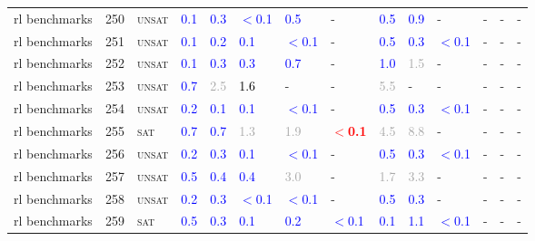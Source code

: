 \begin{center}
{\begin{longtable}{@{}llllllllllllll@{}}
rl benchmarks & 250 & \textsc{unsat} & \textcolor{blue}{0.1} & \textcolor{blue}{0.3} & \textcolor{blue}{$<$0.1} & \textcolor{blue}{0.5} & - & \textcolor{blue}{0.5} & \textcolor{blue}{0.9} & - & - & - & - \\
rl benchmarks & 251 & \textsc{unsat} & \textcolor{blue}{0.1} & \textcolor{blue}{0.2} & \textcolor{blue}{0.1} & \textcolor{blue}{$<$0.1} & - & \textcolor{blue}{0.5} & \textcolor{blue}{0.3} & \textcolor{blue}{$<$0.1} & - & - & - \\
rl benchmarks & 252 & \textsc{unsat} & \textcolor{blue}{0.1} & \textcolor{blue}{0.3} & \textcolor{blue}{0.3} & \textcolor{blue}{0.7} & - & \textcolor{blue}{1.0} & \textcolor{darkgray}{1.5} & - & - & - & - \\
rl benchmarks & 253 & \textsc{unsat} & \textcolor{blue}{0.7} & \textcolor{darkgray}{2.5} & \textcolor{black}{1.6} & - & - & \textcolor{darkgray}{5.5} & - & - & - & - & - \\
rl benchmarks & 254 & \textsc{unsat} & \textcolor{blue}{0.2} & \textcolor{blue}{0.1} & \textcolor{blue}{0.1} & \textcolor{blue}{$<$0.1} & - & \textcolor{blue}{0.5} & \textcolor{blue}{0.3} & \textcolor{blue}{$<$0.1} & - & - & - \\
rl benchmarks & 255 & \textsc{sat} & \textcolor{blue}{0.7} & \textcolor{blue}{0.7} & \textcolor{darkgray}{1.3} & \textcolor{darkgray}{1.9} & \textbf{\textcolor{red}{$<$0.1}} & \textcolor{darkgray}{4.5} & \textcolor{darkgray}{8.8} & - & - & - & - \\
rl benchmarks & 256 & \textsc{unsat} & \textcolor{blue}{0.2} & \textcolor{blue}{0.3} & \textcolor{blue}{0.1} & \textcolor{blue}{$<$0.1} & - & \textcolor{blue}{0.5} & \textcolor{blue}{0.3} & \textcolor{blue}{$<$0.1} & - & - & - \\
rl benchmarks & 257 & \textsc{unsat} & \textcolor{blue}{0.5} & \textcolor{blue}{0.4} & \textcolor{blue}{0.4} & \textcolor{darkgray}{3.0} & - & \textcolor{darkgray}{1.7} & \textcolor{darkgray}{3.3} & - & - & - & - \\
rl benchmarks & 258 & \textsc{unsat} & \textcolor{blue}{0.2} & \textcolor{blue}{0.3} & \textcolor{blue}{$<$0.1} & \textcolor{blue}{$<$0.1} & - & \textcolor{blue}{0.5} & \textcolor{blue}{0.3} & - & - & - & - \\
rl benchmarks & 259 & \textsc{sat} & \textcolor{blue}{0.5} & \textcolor{blue}{0.3} & \textcolor{blue}{0.1} & \textcolor{blue}{0.2} & \textcolor{blue}{$<$0.1} & \textcolor{blue}{0.1} & \textcolor{blue}{1.1} & \textcolor{blue}{$<$0.1} & - & - & - \\

\end{longtable}}
\end{center}
